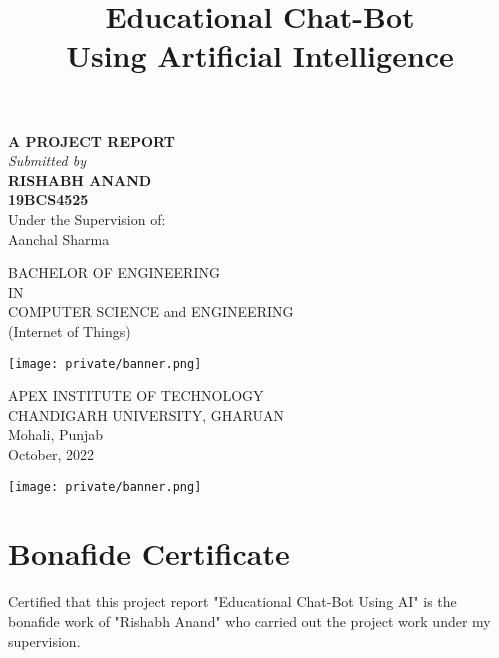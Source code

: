 \documentclass[14pt]{extarticle}
\title{Educational Chat-Bot\\
Using Artificial Intelligence}
\author{}
\date{}
\newcommand\frontmatter{
    \cleardoublepage
    \pagenumbering{roman}
}
\begin{document}
\frontmatter

\maketitle

\vspace{-7em}

\begin{center}
    \singlespacing
\textbf {A PROJECT REPORT} \\
\emph {Submitted by} \\
\textbf {RISHABH ANAND} \\
\textbf {19BCS4525 }   \\


\vspace{1.5em }
Under the Supervision of:\\
Aanchal Sharma \\

\singlespacing

BACHELOR OF ENGINEERING \\
IN \\
COMPUTER SCIENCE and ENGINEERING\\
(Internet of Things)

\vspace{1em}
\texttt{[image: private/banner.png]}

\singlespacing

APEX INSTITUTE OF TECHNOLOGY\\
CHANDIGARH UNIVERSITY, GHARUAN\\
Mohali, Punjab \\

\vspace{2em}
\onehalfspacing
October, 2022

\end{center}
\restoregeometry

\newpage
\begin{center}
    \texttt{[image: private/banner.png]}
\end{center}
\section*{Bonafide Certificate}

Certified that this project report "Educational Chat-Bot Using AI" is the bonafide work of "Rishabh Anand" who carried out the project work under my supervision.
\end{document}

